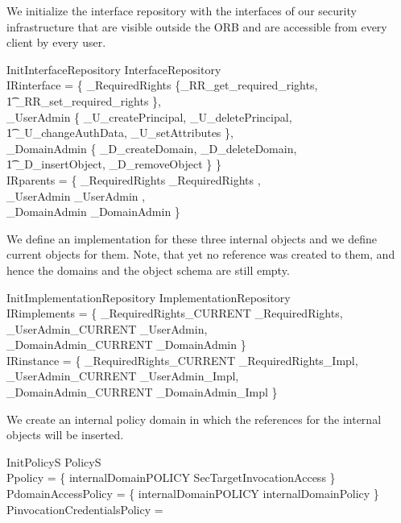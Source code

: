 We initialize the interface repository with the interfaces of our security
infrastructure that are visible outside the ORB and are accessible from
every client by every user.
\begin{schema}{InitInterfaceRepository}
  InterfaceRepository \\
  \where
  IRinterface = \{ \< \_RequiredRights \mapsto \{\_RR\_get\_required\_rights, \\
  \t1 \_RR\_set\_required\_rights \}, \\ 
  \_UserAdmin \mapsto \{ \_U\_createPrincipal, \_U\_deletePrincipal, \\
  \t1 \_U\_changeAuthData, \_U\_setAttributes \}, \\
  \_DomainAdmin \mapsto \{ \_D\_createDomain, \_D\_deleteDomain, \\
  \t1 \_D\_insertObject, \_D\_removeObject \} \} \> \\ 
  IRparents = \{ \< \_RequiredRights \mapsto \langle \_RequiredRights \rangle,\\
   \_UserAdmin \mapsto \langle \_UserAdmin \rangle, \\
   \_DomainAdmin \mapsto \langle \_DomainAdmin \rangle \} \>
\end{schema}
We define an implementation for these three internal objects and we define
current objects for them.  Note, that yet no reference was created to them, and
hence the domains and the object schema are still empty.
\begin{schema}{InitImplementationRepository}
  ImplementationRepository \\
  \where
  IRimplements = \{ \< \_RequiredRights\_CURRENT \mapsto \_RequiredRights, \\
  \_UserAdmin\_CURRENT \mapsto \_UserAdmin, \\
  \_DomainAdmin\_CURRENT \mapsto \_DomainAdmin \} \> \\
  IRinstance = \{ \< \_RequiredRights\_CURRENT \mapsto \_RequiredRights\_Impl, \\
  \_UserAdmin\_CURRENT \mapsto \_UserAdmin\_Impl, \\
  \_DomainAdmin\_CURRENT \mapsto \_DomainAdmin\_Impl \} \>
\end{schema}
We create an internal policy domain in which the references for the internal
objects will be inserted.
\begin{schema}{InitPolicyS}
  PolicyS \\
  \where
  Ppolicy = \{ internalDomainPOLICY \mapsto SecTargetInvocationAccess \} \\
  PdomainAccessPolicy = \{ internalDomainPOLICY \mapsto internalDomainPolicy \} \\
  PinvocationCredentialsPolicy = \emptyset \\
\end{schema}
